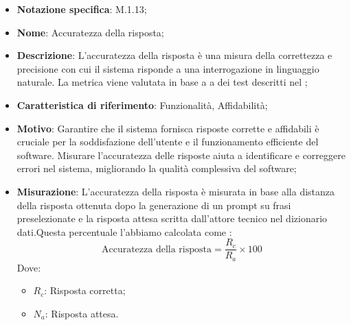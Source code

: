 \begin{itemize}
    \item \textbf{Notazione specifica}: M.1.13;
    \item \textbf{Nome}: Accuratezza della risposta;
    \item \textbf{Descrizione}: L'accuratezza della risposta è una misura della correttezza e precisione con cui il sistema risponde a una interrogazione in linguaggio naturale. La metrica viene valutata in base a a dei test descritti nel ;
    \item \textbf{Caratteristica di riferimento}: Funzionalità, Affidabilità;
    \item \textbf{Motivo}: Garantire che il sistema fornisca risposte corrette e affidabili è cruciale per la soddisfazione dell'utente e il funzionamento efficiente del software. Misurare l'accuratezza delle risposte aiuta a identificare e correggere errori nel sistema, migliorando la qualità complessiva del software;
    \item \textbf{Misurazione}: L'accuratezza della risposta è misurata in base alla distanza della risposta ottenuta dopo la generazione di un prompt su frasi preselezionate e la risposta attesa scritta dall'attore tecnico nel dizionario dati.Questa percentuale l'abbiamo calcolata come :
    \[
    \text{Accuratezza della risposta} = \frac{R_{c}}{R_{a}} \times 100
    \]
    Dove:
    \begin{itemize}
        \item $R_{c}$: Risposta corretta;
        \item $N_{a}$: Risposta attesa.
    \end{itemize}
 \end{itemize}
